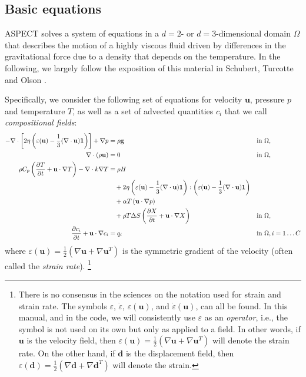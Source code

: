 \documentclass{article}
\newcommand{\aspect}{\textsc{ASPECT}}
\begin{document}
\subsection{Basic equations}
\label{sec:equations}

\aspect{} solves a system of equations in a $d=2$- or $d=3$-dimensional
domain $\Omega$ that describes the motion of a highly viscous fluid driven
by differences in the gravitational force due to a density that depends on
the temperature. In the following, we largely follow the exposition of this
material in Schubert, Turcotte and Olson \cite{STO01}.

Specifically, we consider the following set of equations for velocity $\mathbf
u$, pressure $p$ and temperature $T$, as well as a set of advected quantities
$c_i$ that we call \textit{compositional fields}:
\begin{align}
  \label{eq:stokes-1}
  -\nabla \cdot \left[2\eta \left(\varepsilon(\mathbf u)
                                  - \frac{1}{3}(\nabla \cdot \mathbf u)\mathbf 1\right)
                \right] + \nabla p &=
  \rho \mathbf g
  &
  & \textrm{in $\Omega$},
  \\
  \label{eq:stokes-2}
  \nabla \cdot (\rho \mathbf u) &= 0
  &
  & \textrm{in $\Omega$},
  \\
  \label{eq:temperature}
  \rho C_p \left(\frac{\partial T}{\partial t} + \mathbf u\cdot\nabla T\right)
  - \nabla\cdot k\nabla T
  &=
  \rho H
  \notag
  \\
  &\quad
  +
  2\eta
  \left(\varepsilon(\mathbf u) - \frac{1}{3}(\nabla \cdot \mathbf u)\mathbf 1\right)
  :
  \left(\varepsilon(\mathbf u) - \frac{1}{3}(\nabla \cdot \mathbf u)\mathbf 1\right)
  \\
  &\quad
  +\alpha T \left( \mathbf u \cdot \nabla p \right)
  \notag
  \\
  &\quad
  + \rho T \Delta S \left(\frac{\partial X}{\partial t} + \mathbf u\cdot\nabla X\right)
  &
  & \textrm{in $\Omega$},
  \notag
  \\
  \label{eq:compositional}
  \frac{\partial c_i}{\partial t} + \mathbf u\cdot\nabla c_i
  &=
  q_i
  &
  & \textrm{in $\Omega$},
  i=1\ldots C
\end{align}
where $\varepsilon(\mathbf u) = \frac{1}{2}(\nabla \mathbf u + \nabla\mathbf
u^T)$ is the symmetric gradient of the velocity (often called the
\textit{strain rate}).%
\footnote{There is no consensus in the sciences on the notation used
  for strain and strain rate. The symbols $\varepsilon$,
  $\dot\varepsilon$,  $\varepsilon(\mathbf u)$, and
  $\dot\varepsilon(\mathbf u)$, can all be found. In this manual, and
  in the code, we will consistently use $\varepsilon$ as an
  \textit{operator}, i.e., the symbol is not used on its own but only
  as applied to a field. In other words, if $\mathbf u$ is the
  velocity field, then $\varepsilon(\mathbf u) = \frac{1}{2}(\nabla
  \mathbf u + \nabla\mathbf u^T)$ will denote the strain rate. On the
  other hand, if $\mathbf d$ is the
  displacement field, then $\varepsilon(\mathbf d) = \frac{1}{2}(\nabla
  \mathbf d + \nabla\mathbf d^T)$ will denote the strain.}
\end{document}
